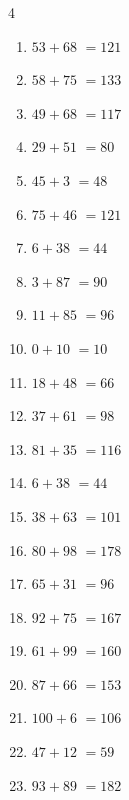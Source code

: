 \begin{multicols}{4}
\begin{enumerate}
  \itemsep=5pt
  \item $53+68$
        $=121$

  \item $58+75$
        $=133$

  \item $49+68$
        $=117$

  \item $29+51$
        $=80$

  \item $45+3$
        $=48$

  \item $75+46$
        $=121$

  \item $6+38$
        $=44$

  \item $3+87$
        $=90$

  \item $11+85$
        $=96$

  \item $0+10$
        $=10$

  \item $18+48$
        $=66$

  \item $37+61$
        $=98$

  \item $81+35$
        $=116$

  \item $6+38$
        $=44$

  \item $38+63$
        $=101$

  \item $80+98$
        $=178$

  \item $65+31$
        $=96$

  \item $92+75$
        $=167$

  \item $61+99$
        $=160$

  \item $87+66$
        $=153$

  \item $100+6$
        $=106$

  \item $47+12$
        $=59$

  \item $93+89$
        $=182$


\end{enumerate}
\end{multicols}
